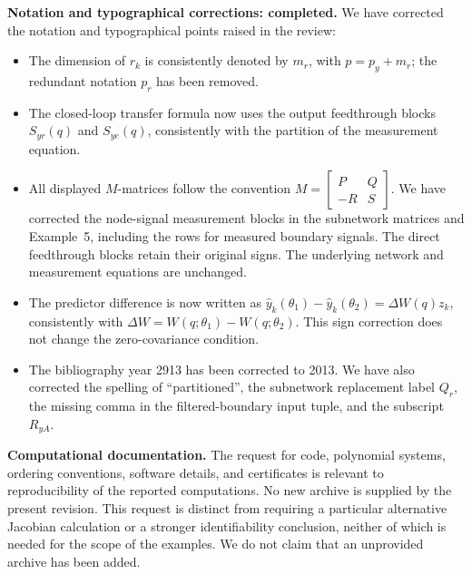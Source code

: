 \documentclass[11pt]{article}
\begin{document}
\textbf{Notation and typographical corrections: completed.}
We have corrected the notation and typographical points raised in the review:
\begin{itemize}
\item The dimension of $r_k$ is consistently denoted by $m_r$, with
$p=p_y+m_r$; the redundant notation $p_r$ has been removed.
\item The closed-loop transfer formula now uses the output feedthrough blocks
$S_{yr}(q)$ and $S_{ye}(q)$, consistently with the partition of the measurement
equation.
\item All displayed $M$-matrices follow the convention
$M=\left[\begin{smallmatrix}P&Q\\-R&S\end{smallmatrix}\right]$.
We have corrected the node-signal measurement blocks in the subnetwork matrices
and Example~5, including the rows for measured boundary signals. The direct
feedthrough blocks retain their original signs. The underlying network and
measurement equations are unchanged.
\item The predictor difference is now written as
$\hat y_k(\theta_1)-\hat y_k(\theta_2)=\Delta W(q)z_k$, consistently with
$\Delta W=W(q;\theta_1)-W(q;\theta_2)$. This sign correction does not change
the zero-covariance condition.
\item The bibliography year 2913 has been corrected to 2013. We have also
corrected the spelling of ``partitioned'', the subnetwork replacement label
$Q_r$, the missing comma in the filtered-boundary input tuple, and the subscript
$R_{yA}$.
\end{itemize}

\textbf{Computational documentation.}
The request for code, polynomial systems, ordering conventions, software details,
and certificates is relevant to reproducibility of the reported computations.
No new archive is supplied by the present revision. This request is distinct
from requiring a particular alternative Jacobian calculation or a stronger
identifiability conclusion, neither of which is needed for the scope of the
examples. We do not claim that an unprovided archive has been added.
\end{document}
